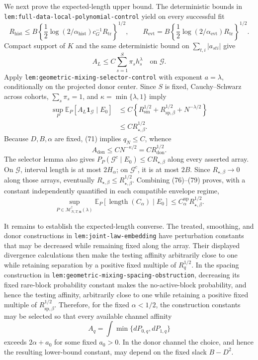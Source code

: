 We next prove the expected-length upper bound.  The deterministic bounds in
\texttt{lem:full-data-local-polynomial-control} yield on every successful
fit
\[
R_{\mathrm{hist}}
\le B\left\{
\frac12\log(2/\alpha_{\mathrm{hist}})c_G^{-1}R_{\mathrm{tr}}
\right\}^{1/2},
\qquad
R_{\mathrm{evt}}
=B\left\{
\frac12\log(2/\alpha_{\mathrm{evt}})R_{\mathrm{tr}}
\right\}^{1/2}.
\tag{76}
\]
Compact support of \(K\) and the same deterministic bound on
\(\sum_{t,i}|a_{sti}|\) give
\[
A_L\le C\sum_{s=1}^{S}\pi_sh_s^\lambda
\quad\text{on }\mathcal G.
\tag{77}
\]
Apply \texttt{lem:geometric-mixing-selector-control} with exponent
\(a=\lambda\), conditionally on the projected donor center.  Since \(S\) is
fixed, Cauchy--Schwarz across cohorts, \(\sum_s\pi_s=1\), and
\(\kappa=\min\{\lambda,1\}\) imply
\[
\begin{aligned}
\sup_P\mathbb E_P[A_L\mathbf 1_{\mathcal G}\mid E_0]
&\le C\left\{
R_{\mathrm{sm}}^{1/2}
+R_{\mathrm{sp},\beta}^{1/2}+N^{-\lambda/2}
\right\}\\
&\le CR_{\star,\beta}^{1/2}.
\end{aligned}
\tag{78}
\]
Because \(D,B,\alpha\) are fixed, (71) implies \(q_N\le C\), whence
\[
A_{\mathrm{don}}
\le CN^{-\kappa/2}=CR_{\mathrm{don}}^{1/2}.
\tag{79}
\]
The selector lemma also gives
\(P_P(\mathcal G^c\mid E_0)\le CR_{\star,\beta}\) along every asserted
array.  On \(\mathcal G\), interval length is at most \(2H_\alpha\); on
\(\mathcal G^c\), it is at most \(2B\).  Since
\(R_{\star,\beta}\to0\) along those arrays, eventually
\(R_{\star,\beta}\le R_{\star,\beta}^{1/2}\).  Combining (76)--(79) proves,
with a constant independently quantified in each compatible envelope
regime,
\[
\sup_{P\in\mathcal M_{N,T,\mathbf n}^{\dagger}(\lambda)}
\mathbb E_P[\operatorname{length}(C_\alpha)\mid E_0]
\le C_\alpha^{\mathrm{up}}R_{\star,\beta}^{1/2}.
\tag{80}
\]

It remains to establish the expected-length converse.  The treated,
smoothing, and donor constructions in \texttt{lem:joint-law-embedding} have
perturbation constants that may be decreased while remaining fixed along the
array.  Their displayed divergence calculations then make the testing
affinity arbitrarily close to one while retaining separation by a positive
fixed multiple of \(R_q^{1/2}\).  In the spacing construction in
\texttt{lem:geometric-mixing-spacing-obstruction}, decreasing its fixed
rare-block probability constant makes the no-active-block probability, and
hence the testing affinity, arbitrarily close to one while retaining a
positive fixed multiple of \(R_{\mathrm{sp},\beta}^{1/2}\).  Therefore, for
the fixed \(\alpha<1/2\), the construction constants may be selected so that
every available channel affinity
\[
A_q=\int\min\{dP_{0,q},dP_{1,q}\}
\]
exceeds \(2\alpha+a_0\) for some fixed \(a_0>0\).  In the donor channel the
choice, and hence the resulting lower-bound constant, may depend on the
fixed slack \(B-D^2\).


